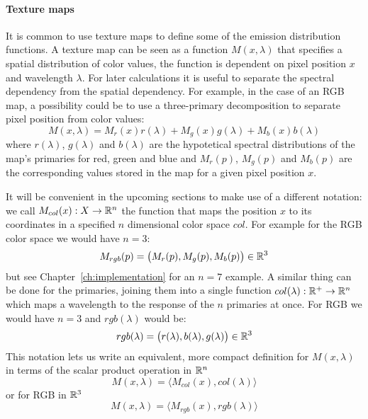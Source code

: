 \paragraph{Texture maps}
It is common to use texture maps to define some of the emission distribution
functions. A texture map can be seen as a function $M(x,\lambda)$ that specifies
a spatial distribution of color values, the function is dependent on pixel
position $x$ and wavelength $\lambda$.
For later calculations it is useful to separate the spectral dependency from the
spatial dependency. For example, in the case of an \gls{RGB} map, a possibility
could be to use a three-primary decomposition to separate pixel position from
color values:
\begin{equation}
M(x,\lambda) = M_r(x) r(\lambda) + M_g(x) g(\lambda) + M_b(x) b(\lambda)
\end{equation}
where $r(\lambda)$, $g(\lambda)$ and $b(\lambda)$ are the hypotetical spectral
distributions of the map's primaries for red, green and blue and $M_r(p)$,
$M_g(p)$ and $M_b(p)$ are the corresponding values stored in the map for a
given pixel position $x$.

It will be convenient in the upcoming sections to make use of a different
notation: we call $M_{col}(x): X\to\mathbb{R}^n$ the function that maps the position $x$
to its coordinates in a specified $n$ dimensional color space $col$. For example
for the \gls{RGB} color space we would have $n = 3$:
\begin{equation}
M_{rgb}(p) = \big(M_r(p), M_g(p), M_b(p)\big) \in \mathbb{R}^3
\end{equation}
but see Chapter~\ref{ch:implementation} for an $n=7$ example. A similar thing
can be done for the primaries, joining them into a single function
$col(\lambda): \mathbb{R}^+\to\mathbb{R}^n$ which maps a wavelength to the response of the $n$
primaries at once. For \gls{RGB} we would have $n = 3$ and $rgb(\lambda)$ would be:
\begin{equation}
rgb(\lambda) = \big(r(\lambda), b(\lambda), g(\lambda)\big) \in\mathbb{R}^3
\end{equation}
This notation lets us write an equivalent, more compact definition for
$M(x,\lambda)$ in terms of the scalar product operation in $\mathbb{R}^n$
\begin{equation}
M(x,\lambda) = \big\langle M_{col}(x), col(\lambda) \big\rangle
\end{equation}
or for \gls{RGB} in $\mathbb{R}^3$
\begin{equation}
M(x,\lambda) = \big\langle M_{rgb}(x), rgb(\lambda) \big\rangle
\end{equation}

